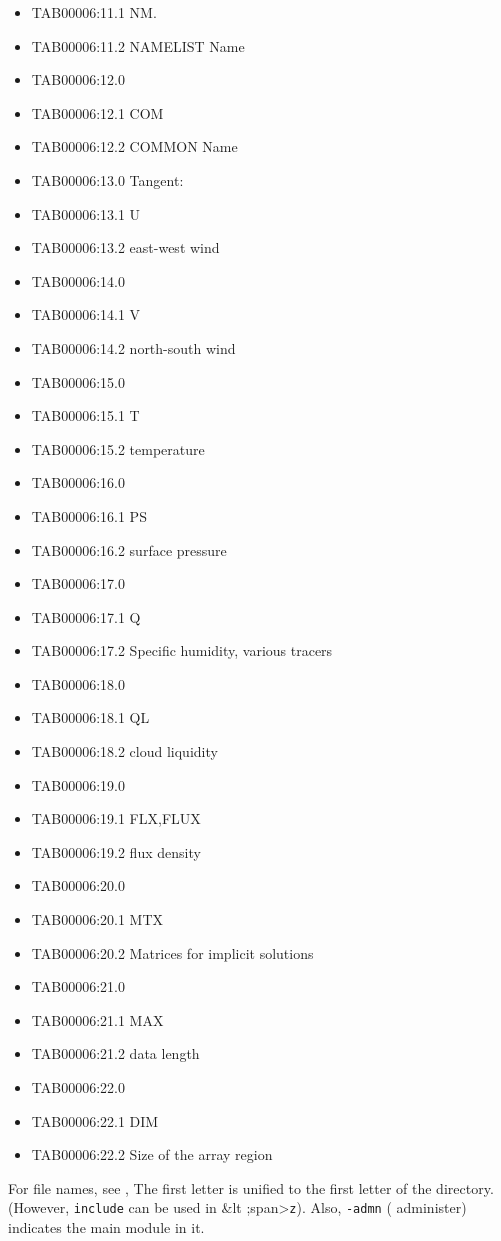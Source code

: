 \begin{itemize}
\item
  TAB00006:11.1 NM.
\item
  TAB00006:11.2 NAMELIST Name
\item
  TAB00006:12.0
\item
  TAB00006:12.1 COM
\item
  TAB00006:12.2 COMMON Name
\item
  TAB00006:13.0 Tangent:
\item
  TAB00006:13.1 U
\item
  TAB00006:13.2 east-west wind
\item
  TAB00006:14.0
\item
  TAB00006:14.1 V
\item
  TAB00006:14.2 north-south wind
\item
  TAB00006:15.0
\item
  TAB00006:15.1 T
\item
  TAB00006:15.2 temperature
\item
  TAB00006:16.0
\item
  TAB00006:16.1 PS
\item
  TAB00006:16.2 surface pressure
\item
  TAB00006:17.0
\item
  TAB00006:17.1 Q
\item
  TAB00006:17.2 Specific humidity, various tracers
\item
  TAB00006:18.0
\item
  TAB00006:18.1 QL
\item
  TAB00006:18.2 cloud liquidity
\item
  TAB00006:19.0
\item
  TAB00006:19.1 FLX,FLUX
\item
  TAB00006:19.2 flux density
\item
  TAB00006:20.0
\item
  TAB00006:20.1 MTX
\item
  TAB00006:20.2 Matrices for implicit solutions
\item
  TAB00006:21.0
\item
  TAB00006:21.1 MAX
\item
  TAB00006:21.2 data length
\item
  TAB00006:22.0
\item
  TAB00006:22.1 DIM
\item
  TAB00006:22.2 Size of the array region
\end{itemize}

For file names, see , The first letter is unified to the first letter of
the directory. (However, {\texttt{include}} can be used in \&lt
;span\textgreater{}\texttt{z}). Also, {\texttt{-admn}} ( administer)
indicates the main module in it.

